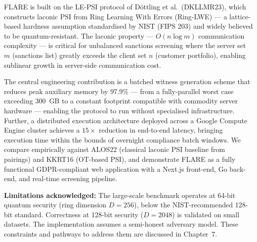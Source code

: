 \documentclass[12pt,a4paper]{report}
\theoremstyle{plain}
\theoremstyle{definition}
\theoremstyle{remark}
\begin{document}
FLARE is built on the LE-PSI protocol of D\"{o}ttling et al.\ (DKLLMR23), which
constructs laconic PSI from Ring Learning With Errors (Ring-LWE) --- a lattice-based
hardness assumption standardised by NIST (FIPS 203) and widely believed to be quantum-resistant.
The laconic property --- $O(n \log m)$ communication complexity --- is critical for
unbalanced sanctions screening where the server set $m$ (sanctions list) greatly exceeds
the client set $n$ (customer portfolio), enabling sublinear growth in server-side
communication cost.

The central engineering contribution is a batched witness generation scheme that reduces
peak auxiliary memory by 97.9\% --- from a fully-parallel worst case exceeding 300~GB
to a constant footprint compatible with commodity server hardware --- enabling the
protocol to run without specialised infrastructure. Further, a distributed
execution architecture deployed across a Google Compute Engine cluster achieves a
$15\times$ reduction in end-to-end latency, bringing execution time within the bounds
of overnight compliance batch windows. We compare empirically against ALOS22 (classical
laconic PSI baseline from pairings) and KKRT16 (OT-based PSI), and demonstrate FLARE
as a fully functional GDPR-compliant web application with a Next.js front-end, Go
back-end, and real-time screening pipeline.

\textbf{Limitations acknowledged:} The large-scale benchmark operates at 64-bit quantum security
(ring dimension $D = 256$), below the NIST-recommended 128-bit standard. Correctness at
128-bit security ($D = 2048$) is validated on small datasets. The implementation assumes
a semi-honest adversary model. These constraints and pathways to address them are
discussed in Chapter~7.

\clearpage

\tableofcontents
\clearpage
\listoffigures
\clearpage
\listoftables
\clearpage

\setcounter{page}{1}








\nocite{*}


\end{document}
